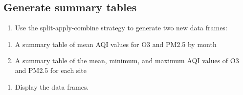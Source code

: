 \documentclass[]{article}
\providecommand{\tightlist}{%
  \setlength{\itemsep}{0pt}\setlength{\parskip}{0pt}}
\begin{document}
\subsection{Generate summary tables}\label{generate-summary-tables}

\begin{enumerate}
\def\labelenumi{\arabic{enumi}.}
\setcounter{enumi}{11}
\tightlist
\item
  Use the split-apply-combine strategy to generate two new data frames:
\end{enumerate}

\begin{enumerate}
\def\labelenumi{\alph{enumi}.}
\tightlist
\item
  A summary table of mean AQI values for O3 and PM2.5 by month
\item
  A summary table of the mean, minimum, and maximum AQI values of O3 and
  PM2.5 for each site
\end{enumerate}

\begin{enumerate}
\def\labelenumi{\arabic{enumi}.}
\setcounter{enumi}{12}
\tightlist
\item
  Display the data frames.
\end{enumerate}
\end{document}
